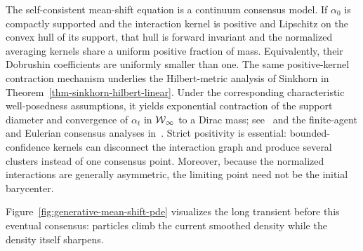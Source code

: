 \begin{rem}\label{rem-mean-shift-consensus}
The self-consistent mean-shift equation is a continuum consensus model. If $\alpha_0$ is compactly supported and the interaction kernel is positive and Lipschitz on the convex hull of its support, that hull is forward invariant and the normalized averaging kernels share a uniform positive fraction of mass. Equivalently, their Dobrushin coefficients are uniformly smaller than one. The same positive-kernel contraction mechanism underlies the Hilbert-metric analysis of Sinkhorn in Theorem~\ref{thm-sinkhorn-hilbert-linear}. Under the corresponding characteristic well-posedness assumptions, it yields exponential contraction of the support diameter and convergence of $\alpha_t$ in $\operatorname{\mathcal{W}}_\infty$ to a Dirac mass; see~\cite{HegselmannKrause2002OpinionDynamics,Chen2015BlurringMeanShift,MotschTadmor2014Heterophilious} and the finite-agent and Eulerian consensus analyses in~\cite{BlondelHendrickxTsitsiklis2009Krause,CanutoFagnaniTilli2012EulerianKrause}. Strict positivity is essential: bounded-confidence kernels can disconnect the interaction graph and produce several clusters instead of one consensus point. Moreover, because the normalized interactions are generally asymmetric, the limiting point need not be the initial barycenter.
\end{rem}

Figure~\ref{fig:generative-mean-shift-pde} visualizes the long transient before this eventual consensus: particles climb the current smoothed density while the density itself sharpens.

